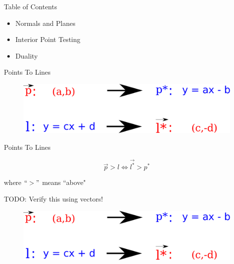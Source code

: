 \documentclass{beamer}
\begin{document}

\begin{frame}{Table of Contents}

\begin{itemize}[label=$\vartriangleright$]
	\item Normals and Planes
    \item Interior Point Testing
\end{itemize}
\begin{itemize}[label=$\blacktriangleright$]
    \item Duality
\end{itemize}

\end{frame}


\begin{frame}{Points To Lines}

\begin{figure}[t]
	\centering
	\includegraphics[width=\textwidth]{dualityEquations.pdf}
\end{figure}

\end{frame}



\begin{frame}{Points To Lines}


\[ \vec{p} > l  \iff \vec{l^*} > p^* \]


where $``>"$ means ``above"

TODO: Verify this using vectors!

\begin{figure}[t]
	\centering
	\includegraphics[width=\textwidth]{dualityEquations.pdf}
\end{figure}



\end{frame}
\end{document}

